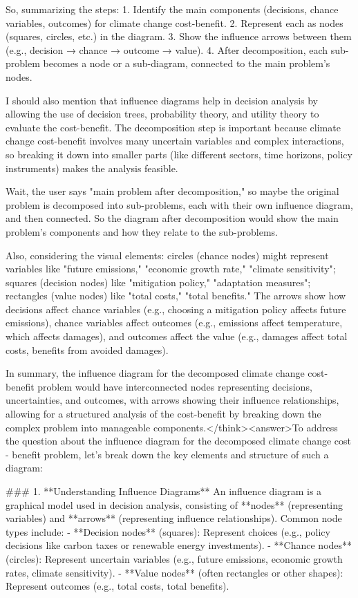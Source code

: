 So, summarizing the steps: 1. Identify the main components (decisions, chance variables, outcomes) for climate change cost-benefit. 2. Represent each as nodes (squares, circles, etc.) in the diagram. 3. Show the influence arrows between them (e.g., decision → chance → outcome → value). 4. After decomposition, each sub-problem becomes a node or a sub-diagram, connected to the main problem's nodes. 

I should also mention that influence diagrams help in decision analysis by allowing the use of decision trees, probability theory, and utility theory to evaluate the cost-benefit. The decomposition step is important because climate change cost-benefit involves many uncertain variables and complex interactions, so breaking it down into smaller parts (like different sectors, time horizons, policy instruments) makes the analysis feasible. 

Wait, the user says "main problem after decomposition," so maybe the original problem is decomposed into sub-problems, each with their own influence diagram, and then connected. So the diagram after decomposition would show the main problem's components and how they relate to the sub-problems. 

Also, considering the visual elements: circles (chance nodes) might represent variables like "future emissions," "economic growth rate," "climate sensitivity"; squares (decision nodes) like "mitigation policy," "adaptation measures"; rectangles (value nodes) like "total costs," "total benefits." The arrows show how decisions affect chance variables (e.g., choosing a mitigation policy affects future emissions), chance variables affect outcomes (e.g., emissions affect temperature, which affects damages), and outcomes affect the value (e.g., damages affect total costs, benefits from avoided damages). 

In summary, the influence diagram for the decomposed climate change cost-benefit problem would have interconnected nodes representing decisions, uncertainties, and outcomes, with arrows showing their influence relationships, allowing for a structured analysis of the cost-benefit by breaking down the complex problem into manageable components.</think><answer>To address the question about the influence diagram for the decomposed climate change cost - benefit problem, let’s break down the key elements and structure of such a diagram:  


### 1. **Understanding Influence Diagrams**  
An influence diagram is a graphical model used in decision analysis, consisting of **nodes** (representing variables) and **arrows** (representing influence relationships). Common node types include:  
- **Decision nodes** (squares): Represent choices (e.g., policy decisions like carbon taxes or renewable energy investments).  
- **Chance nodes** (circles): Represent uncertain variables (e.g., future emissions, economic growth rates, climate sensitivity).  
- **Value nodes** (often rectangles or other shapes): Represent outcomes (e.g., total costs, total benefits).  


